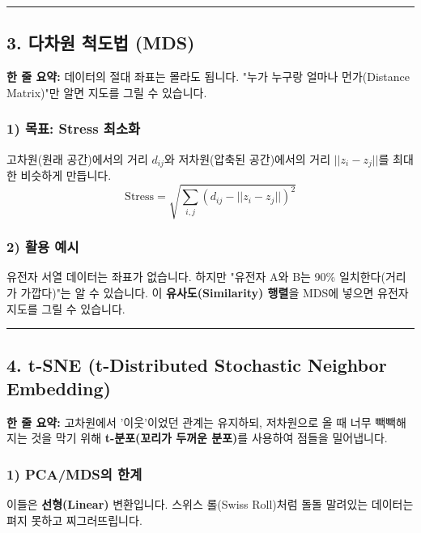 \documentclass[11pt,a4paper]{book}
\theoremstyle{definition}
\begin{document}
\vspace{0.5cm}\hrule\vspace{0.5cm}

\subsection{3. 다차원 척도법 (MDS)}

\begin{conceptbox}[title={개념 3: 거리표로 지도 복원하기}]
\textbf{한 줄 요약:} 데이터의 절대 좌표는 몰라도 됩니다. "누가 누구랑 얼마나 먼가(Distance Matrix)"만 알면 지도를 그릴 수 있습니다.
\end{conceptbox}

\subsubsection*{1) 목표: Stress 최소화}
고차원(원래 공간)에서의 거리 $d_{ij}$와 저차원(압축된 공간)에서의 거리 $||z_i - z_j||$를 최대한 비슷하게 만듭니다.
$$ \text{Stress} = \sqrt{\sum_{i,j} (d_{ij} - ||z_i - z_j||)^2} $$

\subsubsection*{2) 활용 예시}
유전자 서열 데이터는 좌표가 없습니다. 하지만 "유전자 A와 B는 90\% 일치한다(거리가 가깝다)"는 알 수 있습니다. 이 \textbf{유사도(Similarity) 행렬}을 MDS에 넣으면 유전자 지도를 그릴 수 있습니다.

\vspace{0.5cm}\hrule\vspace{0.5cm}

\subsection{4. t-SNE (t-Distributed Stochastic Neighbor Embedding)}


\begin{conceptbox}[title={개념 4: 구겨진 종이 펴기 \& 거리두기}]
\textbf{한 줄 요약:} 고차원에서 '이웃'이었던 관계는 유지하되, 저차원으로 올 때 너무 빽빽해지는 것을 막기 위해 \textbf{t-분포(꼬리가 두꺼운 분포)}를 사용하여 점들을 밀어냅니다.
\end{conceptbox}

\subsubsection*{1) PCA/MDS의 한계}
이들은 \textbf{선형(Linear)} 변환입니다. 스위스 롤(Swiss Roll)처럼 돌돌 말려있는 데이터는 펴지 못하고 찌그러뜨립니다.
\end{document}

